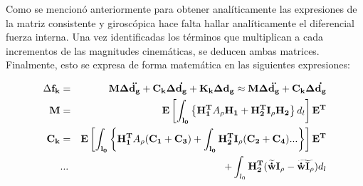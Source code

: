 Como se mencionó anteriormente para obtener analíticamente las expresiones de la matriz consistente y giroscópica hace falta hallar analíticamente el diferencial fuerza interna. Una vez identificadas los términos que multiplican a cada incrementos de las magnitudes cinemáticas, se deducen ambas matrices. Finalmente, esto se expresa de forma matemática en las siguientes expresiones:

\begin{eqnarray}
	\Delta \bf{f_k}&= &\bf{M} \Delta \ddot{\bf{d}_g}+\bf{C}_k \Delta \dot{\bf{d}_g}+\bf{K}_k \Delta \bf{d}_g\approx \bf{M} \Delta \ddot{\bf{d}_g}+\bf{C}_k \Delta \dot{\bf{d}_g}\\
	\label{Eqn:PRE:MatrizM}
	\bf{M}&=&\bf{E}\left [ \int _{l_0} \left \{ \bf{H}_1^T \text{$A_\rho$}\bf{H}_1 +\bf{H}_2^T\bf{I}_\rho\bf{H_2} \right \} \text{$d_l$} \right  ]\bf{E}^T\\
	\label{Eqn:PRE:MtarizC}
	\bf{C}_k&=&\bf{E}\left [ \int _{l_0} \left \{ \bf{H}_1^T \text{$A_\rho$}(\bf{C}_1+\bf{C}_3) +\int _{l_0}\bf{H}_2^T\bf{I}_\rho(\bf{C}_2+\bf{C}_4) ...\right \}\right  ]\bf{E}^T\\
	&...& +\int_{l_0} \bf{H}_2 ^T(\widetilde{\dot{w}}\bf{I}_\rho-\widetilde{\dot{w}\bf{I}_\rho}) \text{$d_l$}
\end{eqnarray}

\newpage
